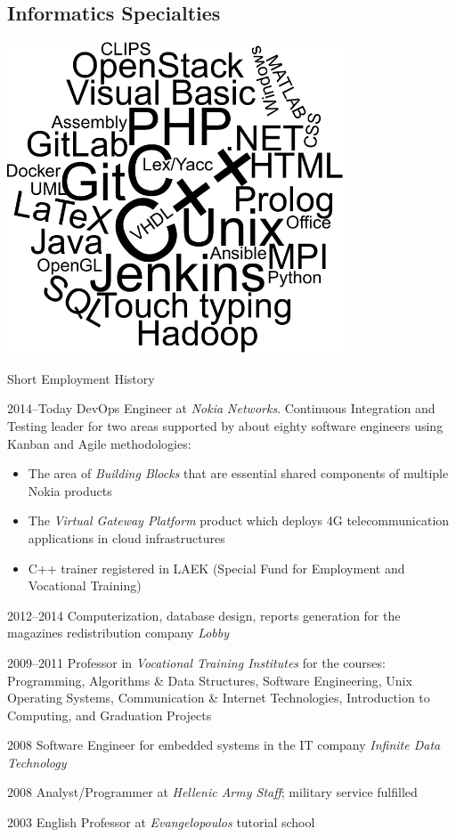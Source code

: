 \documentclass[a4paper]{article}
\begin{document}
\begin{cv}{}
\subsection*{Informatics Specialties}
\begin{center}
    \includegraphics[height=25em]{SkillsCloud}
\end{center}

\begin{cvlist}{Short Employment History}
\item[2014--Today]
\textsf{DevOps Engineer} at \emph{Nokia Networks}.
Continuous Integration and Testing leader for two areas
supported by about eighty software engineers using Kanban
and Agile methodologies:
\begin{itemize}
    \item The area of \emph{Building Blocks} that are
          essential shared components of multiple Nokia
          products
    \item The \emph{Virtual Gateway Platform} product which
          deploys 4G telecommunication applications in cloud
          infrastructures
    \item C++ trainer registered in LAEK (Special Fund for
          Employment and Vocational Training)
\end{itemize}
\item[2012--2014]
\textsf{Computerization}, database design, reports
generation for the magazines redistribution company
\emph{Lobby}
\item[2009--2011]
\textsf{Professor} in \emph{Vocational Training Institutes}
for the courses: Programming, Algorithms \& Data Structures,
Software Engineering, Unix Operating Systems, Communication
\& Internet Technologies, Introduction to Computing, and
Graduation Projects
\item[2008]
\textsf{Software Engineer} for embedded systems in the IT
company \emph{Infinite Data Technology}
\item[2008]
\textsf{Analyst/Programmer} at \emph{Hellenic Army Staff};
military service fulfilled
\item[2003]
\textsf{English Professor} at \emph{Evangelopoulos} tutorial
school
\end{cvlist}


\end{cv}
\end{document}
